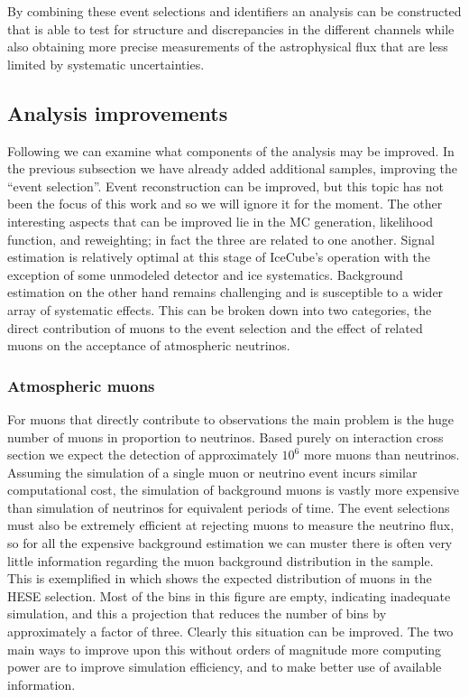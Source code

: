 By combining these event selections and identifiers an analysis can be constructed that is able to test for structure and discrepancies in the different channels while also obtaining more precise measurements of the astrophysical flux that are less limited by systematic uncertainties.

\subsection{Analysis improvements}
Following  we can examine what components of the analysis may be improved.
In the previous subsection we have already added additional samples, improving the ``event selection''.
Event reconstruction can be improved, but this topic has not been the focus of this work and so we will ignore it for the moment.
The other interesting aspects that can be improved lie in the MC generation, likelihood function, and reweighting; in fact the three are related to one another.
Signal estimation is relatively optimal at this stage of IceCube's operation with the exception of some unmodeled detector and ice systematics.
Background estimation on the other hand remains challenging and is susceptible to a wider array of systematic effects.
This can be broken down into two categories, the direct contribution of muons to the event selection and the effect of related muons on the acceptance of atmospheric neutrinos.

\subsubsection{Atmospheric muons}
For muons that directly contribute to observations the main problem is the huge number of muons in proportion to neutrinos.
Based purely on interaction cross section we expect the detection of approximately $10^6$ more muons than neutrinos.
Assuming the simulation of a single muon or neutrino event incurs similar computational cost, the simulation of background muons is vastly more expensive than simulation of neutrinos for equivalent periods of time.
The event selections must also be extremely efficient at rejecting muons to measure the neutrino flux, so for all the expensive background estimation we can muster there is often very little information regarding the muon background distribution in the sample.
This is exemplified in  which shows the expected distribution of muons in the HESE selection.
Most of the bins in this figure are empty, indicating inadequate simulation, and this a projection that reduces the number of bins by approximately a factor of three.
Clearly this situation can be improved.
The two main ways to improve upon this without orders of magnitude more computing power are to improve simulation efficiency, and to make better use of available information.

